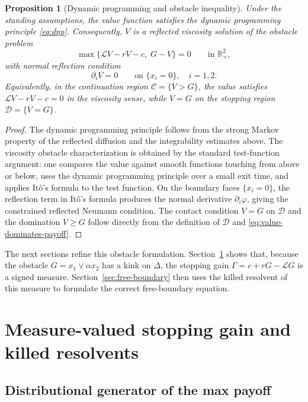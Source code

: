 \documentclass[pdflatex,sn-mathphys-num]{sn-jnl}
\theoremstyle{plain}
\newtheorem{proposition}[theorem]{Proposition}
\theoremstyle{definition}
\theoremstyle{remark}
\numberwithin{equation}{section}
\begin{document}
\begin{proposition}[Dynamic programming and obstacle inequality] \label{prop:dpp-obstacle} 
Under the standing assumptions, the value function satisfies the dynamic programming principle \eqref{eq:dpp}. Consequently, \(V\) is a reflected viscosity solution of the obstacle problem 
\[ 
\max\big\{\mathcal LV-rV-c,\;G-V\big\}=0 \qquad \text{in }\mathbb R_+^2, 
\] 
with normal reflection condition 
\[ 
\partial_i V=0 \qquad \text{on }\{x_i=0\},\quad i=1,2 . 
\] 
Equivalently, in the continuation region \(\mathcal C=\{V>G\}\), the value satisfies 
$\mathcal LV-rV-c=0 $
in the viscosity sense, while \(V=G\) on the stopping region \(\mathcal D=\{V=G\}\). 
\end{proposition} 
\begin{proof} 
The dynamic programming principle follows from the strong Markov property of the reflected diffusion and the integrability estimates above. The viscosity obstacle characterization is obtained by the standard test-function argument: one compares the value against smooth functions touching from above or below, uses the dynamic programming principle over a small exit time, and applies It\^{o}'s formula to the test function. On the boundary faces \(\{x_i=0\}\), the reflection term in It\^{o}'s formula produces the normal derivative \(\partial_i\varphi\), giving the constrained reflected Neumann condition. The contact condition \(V=G\) on \(\mathcal D\) and the domination \(V\ge G\) follow directly from the definition of \(\mathcal D\) and \eqref{eq:value-dominates-payoff}. 
\end{proof} 
The next sections refine this obstacle formulation. Section~\ref{sec:measure-gain} shows that, because the obstacle \(G=x_1\vee\alpha x_2\) has a kink on \(\Delta\), the stopping gain \(\Gamma=c+rG-\mathcal LG\) is a signed measure. Section~\ref{sec:free-boundary} then uses the killed resolvent of this measure to formulate the correct free-boundary equation.  

\section{Measure-valued stopping gain and killed resolvents} \label{sec:measure-gain}  

\subsection{Distributional generator of the max payoff} \label{subsec:distributional-generator} 
\end{document}
